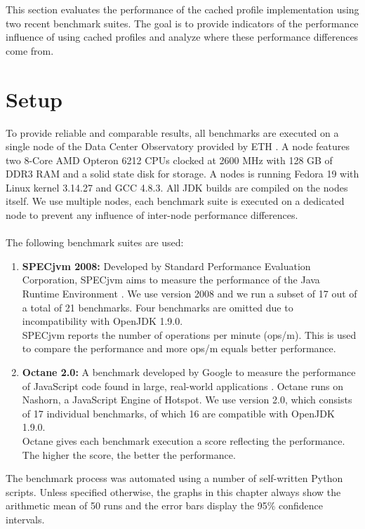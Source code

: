 This section evaluates the performance of the cached profile implementation using two recent benchmark suites. The goal is to provide indicators of the performance influence of using cached profiles and analyze where these performance differences come from.
\section{Setup}
\label{s:perf_setup}
To provide reliable and comparable results, all benchmarks are executed on a single node of the Data Center Observatory provided by ETH \cite{ethdco}.
A node features two 8-Core AMD Opteron 6212 CPUs clocked at 2600 MHz with 128 GB of DDR3 RAM and a solid state disk for storage.
A nodes is running Fedora 19 with Linux kernel 3.14.27 and GCC 4.8.3. All JDK builds are compiled on the nodes itself. We use multiple nodes, each benchmark suite is executed on a dedicated node to prevent any influence of inter-node performance differences.
\\\\
The following benchmark suites are used:
\begin{enumerate}
  \item \textbf{SPECjvm 2008:} Developed by Standard Performance Evaluation Corporation, SPECjvm aims to measure the performance of the Java Runtime Environment \cite{specjvm}.  We use version 2008 and we run a subset of 17 out of a total of 21 benchmarks. Four benchmarks are omitted due to incompatibility with OpenJDK 1.9.0.
  \\
  SPECjvm reports the number of operations per minute (ops/m). This is used to compare the performance and more ops/m equals better performance.
  \item \textbf{Octane 2.0:} A benchmark developed by Google to measure the performance of JavaScript code found in large, real-world applications \cite{octane}. Octane runs on Nashorn, a JavaScript Engine of Hotspot. We use version 2.0, which consists of 17 individual benchmarks, of which 16 are compatible with OpenJDK 1.9.0. 
  \\
  Octane gives each benchmark execution a score reflecting the performance. The higher the score, the better the performance.
\end{enumerate}
The benchmark process was automated using a number of self-written Python scripts. Unless specified otherwise, the graphs in this chapter always show the arithmetic mean of 50 runs and the error bars display the 95\% confidence intervals.

